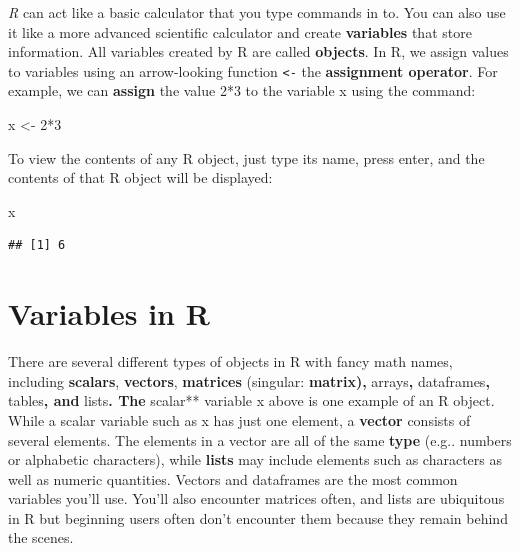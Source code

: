 \documentclass[
]{book}
\newenvironment{Shaded}{\begin{snugshade}}{\end{snugshade}}
\newcommand{\DecValTok}[1]{\textcolor[rgb]{0.00,0.00,0.81}{#1}}
\newcommand{\NormalTok}[1]{#1}
\newcommand{\OtherTok}[1]{\textcolor[rgb]{0.56,0.35,0.01}{#1}}
\newcommand{\SpecialCharTok}[1]{\textcolor[rgb]{0.00,0.00,0.00}{#1}}
\begin{document}
\emph{R} can act like a basic calculator that you type commands in to. You can also use it like a more advanced scientific calculator and create \textbf{variables} that store information. All variables created by R are called \textbf{objects}. In R, we assign values to variables using an arrow-looking function \texttt{\textless{}-} the \textbf{assignment operator}. For example, we can \textbf{assign} the value 2*3 to the variable x using the command:

\begin{Shaded}
\begin{Highlighting}[]
\NormalTok{x }\OtherTok{\textless{}{-}} \DecValTok{2}\SpecialCharTok{*}\DecValTok{3}
\end{Highlighting}
\end{Shaded}

To view the contents of any R object, just type its name, press enter, and the contents of that R object will be displayed:

\begin{Shaded}
\begin{Highlighting}[]
\NormalTok{x}
\end{Highlighting}
\end{Shaded}

\begin{verbatim}
## [1] 6
\end{verbatim}

\hypertarget{variables-in-r}{%
\section{Variables in R}\label{variables-in-r}}

There are several different types of objects in R with fancy math names, including \textbf{scalars}, \textbf{vectors}, \textbf{matrices} (singular: \textbf{matrix), }arrays\textbf{, }dataframes\textbf{, }tables\textbf{, and }lists\textbf{. The }scalar** variable x above is one example of an R object. While a scalar variable such as x has just one element, a \textbf{vector} consists of several elements. The elements in a vector are all of the same \textbf{type} (e.g.. numbers or alphabetic characters), while \textbf{lists} may include elements such as characters as well as numeric quantities. Vectors and dataframes are the most common variables you'll use. You'll also encounter matrices often, and lists are ubiquitous in R but beginning users often don't encounter them because they remain behind the scenes.
\end{document}
